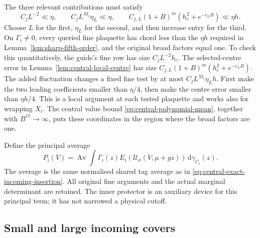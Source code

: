 \documentclass[11pt,reqno]{amsart}
\numberwithin{equation}{section}
\theoremstyle{definition}
\theoremstyle{remark}
\newcommand{\dd}{\mathrm d}
\begin{document}
The three relevant contributions must satisfy
\[
 C_jL^{-2}\ll\eta,\qquad
 C_jL^{M_j}\eta_L\ll\eta,\qquad
 C_{j,L}(1+B)^m(h_c^2+e^{-c_LB})\ll\eta h.
\]
Choose \(L\) for the first, \(\eta_L\) for the second,
and then increase entry for the third. On
\(\Gamma_i\ne0\), every queried fine plaquette has chord
less than the \(\eta h\) required in
Lemma~\ref{lem:sharp-fifth-order}, and the original broad
factors equal one. To check this quantitatively, the guide's
fine row has size \(C_jL^{-2}h_c\). The selected-centre error
in Lemma~\ref{lem:central-local-centre} has size
\(C_{j,L}(1+B)^m(h_c^2+e^{-c_LB})\). The added fluctuation
changes a fixed fine test by at most
\(C_jL^{M_j}\eta_Lh\). First make the two leading
coefficients smaller than \(\eta/4\), then make the centre
error smaller than \(\eta h/4\). This is a local argument
at each tested plaquette and works also for wrapping
\(X_i\). The central value bound
\eqref{eq:central-polynomial-mean}, together with
\(B^{17}\to\infty\), puts these coordinates in the region
where the broad factors are one.

Define the principal average
\begin{equation}
 P_i(V)=\operatorname{Av}\int\Gamma_i(z)
       E_i(\mathcal U_\sigma(V,\mu+gz))\,\dd\gamma_{C_i}(z).
 \label{eq:sharp-principal-average}
\end{equation}
The average is the same normalised shared tag average as
in \eqref{eq:central-exact-incoming-insertion}. All original
fine arguments and the actual marginal determinant are
retained. The inner protector is an auxiliary device for
this principal term; it has not narrowed a physical cutoff.

\subsection{Small and large incoming covers}
\end{document}
